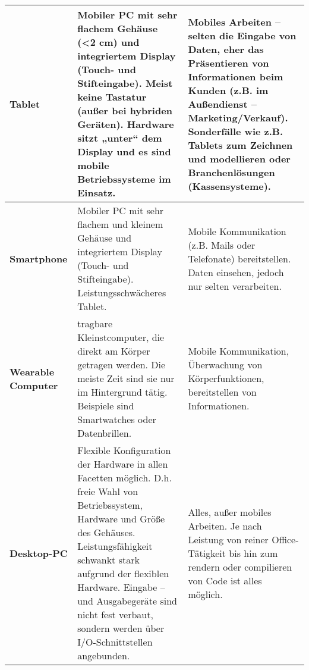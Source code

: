 \documentclass[asp1.tex]{subfiles}
\begin{document}
\begin{longtable}{|p{}|p{}|p{}|}
    \textbf{Tablet}            & Mobiler PC mit sehr flachem Gehäuse (<2 cm) und integriertem Display (Touch- und Stifteingabe). Meist keine Tastatur (außer bei hybriden Geräten). \newline Hardware sitzt „unter“ dem Display und es sind mobile Betriebssysteme im Einsatz.                                                                                    & Mobiles Arbeiten – selten die Eingabe von Daten, eher das Präsentieren von Informationen beim Kunden (z.B. im Außendienst – Marketing/Verkauf). \newline Sonderfälle wie z.B. Tablets zum Zeichnen und modellieren oder Branchenlösungen (Kassensysteme). \\\hline

    \textbf{Smartphone}        & Mobiler PC mit sehr flachem und kleinem Gehäuse und integriertem Display (Touch- und Stifteingabe). Leistungsschwächeres Tablet.                                                                                                                                                                                                 & Mobile Kommunikation (z.B. Mails oder Telefonate) bereitstellen. Daten einsehen, jedoch nur selten verarbeiten.                                                                                                                                           \\\hline

    \textbf{Wearable Computer} & tragbare Kleinstcomputer, die direkt am Körper getragen werden. Die meiste Zeit sind sie nur im Hintergrund tätig. Beispiele sind Smartwatches oder Datenbrillen.                                                                                                                                                                & Mobile Kommunikation, Überwachung von Körperfunktionen, bereitstellen von Informationen.                                                                                                                                                                  \\\hline

    \textbf{Desktop-PC}        & Flexible Konfiguration der Hardware in allen Facetten möglich. D.h. freie Wahl von Betriebssystem, Hardware und Größe des Gehäuses. \newline Leistungsfähigkeit schwankt stark aufgrund der flexiblen Hardware. \newline Eingabe – und Ausgabegeräte sind nicht fest verbaut, sondern werden über I/O-Schnittstellen angebunden. & Alles, außer mobiles Arbeiten. \newline Je nach Leistung von reiner Office-Tätigkeit bis hin zum rendern oder compilieren von Code ist alles möglich.                                                                                                     \\\hline


\end{longtable}
\end{document}
